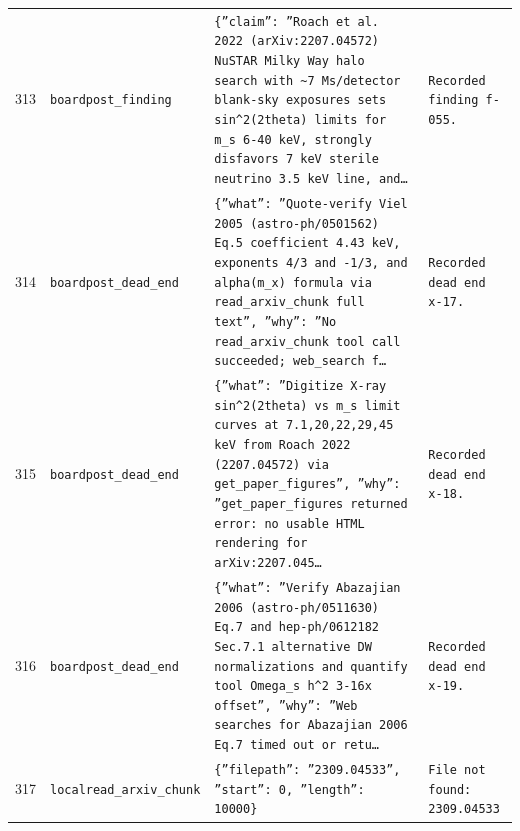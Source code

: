 \documentclass[11pt,a4paper]{article}
\begin{document}
\begin{longtable}{@{}p{}p{}p{}p{}@{}}
313 & \texttt{board}\newline\texttt{post\_\allowbreak{}finding} & \texttt{\{''claim'':\allowbreak{} ''Roach et al. 2022 (arXiv:\allowbreak{}2207.04572)\allowbreak{} NuSTAR Milky Way halo search with \textasciitilde{}\allowbreak{}7 Ms/\allowbreak{}detector blank-sky exposures sets sin\textasciicircum{}\allowbreak{}2(2theta)\allowbreak{} limits for m\_\allowbreak{}s 6-40 keV,\allowbreak{} strongly disfavors 7 keV sterile neutrino 3.5 keV line,\allowbreak{} and\ldots{}\allowbreak{}} & \texttt{Recorded finding f-055.} \\
314 & \texttt{board}\newline\texttt{post\_\allowbreak{}dead\_\allowbreak{}end} & \texttt{\{''what'':\allowbreak{} ''Quote-verify Viel 2005 (astro-ph/\allowbreak{}0501562)\allowbreak{} Eq.5 coefficient 4.43 keV,\allowbreak{} exponents 4/\allowbreak{}3 and -1/\allowbreak{}3,\allowbreak{} and alpha(m\_\allowbreak{}x)\allowbreak{} formula via read\_\allowbreak{}arxiv\_\allowbreak{}chunk full text'',\allowbreak{} ''why'':\allowbreak{} ''No read\_\allowbreak{}arxiv\_\allowbreak{}chunk tool call succeeded;\allowbreak{} web\_\allowbreak{}search f\ldots{}\allowbreak{}} & \texttt{Recorded dead end x-17.} \\
315 & \texttt{board}\newline\texttt{post\_\allowbreak{}dead\_\allowbreak{}end} & \texttt{\{''what'':\allowbreak{} ''Digitize X-ray sin\textasciicircum{}\allowbreak{}2(2theta)\allowbreak{} vs m\_\allowbreak{}s limit curves at 7.1,\allowbreak{}20,\allowbreak{}22,\allowbreak{}29,\allowbreak{}45 keV from Roach 2022 (2207.04572)\allowbreak{} via get\_\allowbreak{}paper\_\allowbreak{}figures'',\allowbreak{} ''why'':\allowbreak{} ''get\_\allowbreak{}paper\_\allowbreak{}figures returned error:\allowbreak{} no usable HTML rendering for arXiv:\allowbreak{}2207.045\ldots{}\allowbreak{}} & \texttt{Recorded dead end x-18.} \\
316 & \texttt{board}\newline\texttt{post\_\allowbreak{}dead\_\allowbreak{}end} & \texttt{\{''what'':\allowbreak{} ''Verify Abazajian 2006 (astro-ph/\allowbreak{}0511630)\allowbreak{} Eq.7 and hep-ph/\allowbreak{}0612182 Sec.7.1 alternative DW normalizations and quantify tool Omega\_\allowbreak{}s h\textasciicircum{}\allowbreak{}2 3-16x offset'',\allowbreak{} ''why'':\allowbreak{} ''Web searches for Abazajian 2006 Eq.7 timed out or retu\ldots{}\allowbreak{}} & \texttt{Recorded dead end x-19.} \\
317 & \texttt{local}\newline\texttt{read\_\allowbreak{}arxiv\_\allowbreak{}chunk} & \texttt{\{''filepath'':\allowbreak{} ''2309.04533'',\allowbreak{} ''start'':\allowbreak{} 0,\allowbreak{} ''length'':\allowbreak{} 10000\}\allowbreak{}} & \texttt{File not found:\allowbreak{} 2309.04533} \\

\end{longtable}
\end{document}
